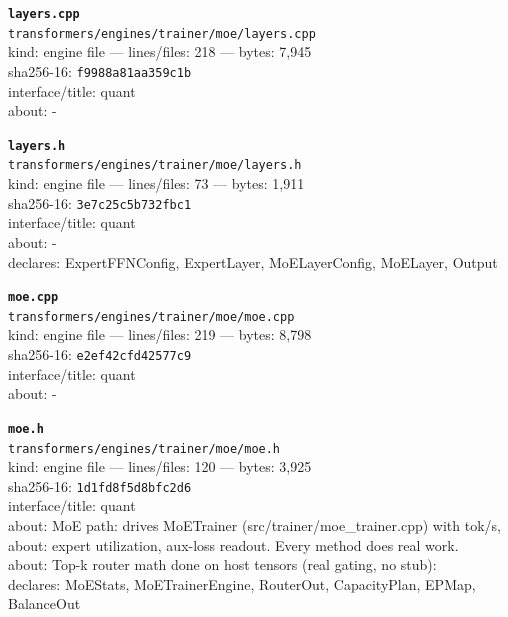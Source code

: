 \noindent\textbf{\texttt{layers.cpp}}\\
\texttt{transformers/engines/trainer/moe/layers.cpp}\\
kind: engine file --- lines/files: 218 --- bytes: 7,945\\
sha256-16: \texttt{f9988a81aa359c1b}\\
interface/title: quant\\
about: -\\
\vspace*{6.0pt}

\noindent\textbf{\texttt{layers.h}}\\
\texttt{transformers/engines/trainer/moe/layers.h}\\
kind: engine file --- lines/files: 73 --- bytes: 1,911\\
sha256-16: \texttt{3e7c25c5b732fbc1}\\
interface/title: quant\\
about: -\\
declares: ExpertFFNConfig, ExpertLayer, MoELayerConfig, MoELayer, Output\\
\vspace*{6.0pt}
\newpage

\noindent\textbf{\texttt{moe.cpp}}\\
\texttt{transformers/engines/trainer/moe/moe.cpp}\\
kind: engine file --- lines/files: 219 --- bytes: 8,798\\
sha256-16: \texttt{e2ef42cfd42577c9}\\
interface/title: quant\\
about: -\\
\vspace*{6.0pt}

\noindent\textbf{\texttt{moe.h}}\\
\texttt{transformers/engines/trainer/moe/moe.h}\\
kind: engine file --- lines/files: 120 --- bytes: 3,925\\
sha256-16: \texttt{1d1fd8f5d8bfc2d6}\\
interface/title: quant\\
about: MoE path: drives MoETrainer (src/trainer/moe\_trainer.cpp) with tok/s,\\
about: expert utilization, aux-loss readout. Every method does real work.\\
about: Top-k router math done on host tensors (real gating, no stub):\\
declares: MoEStats, MoETrainerEngine, RouterOut, CapacityPlan, EPMap, BalanceOut\\
\vspace*{6.0pt}

